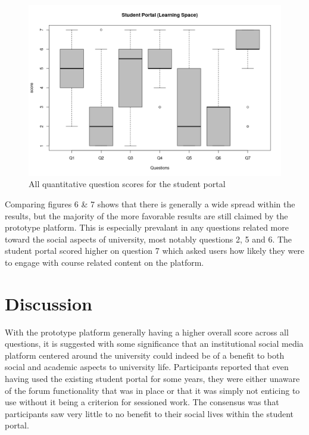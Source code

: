 \documentclass[lettersize,journal]{IEEEtran}
\begin{document}
		\begin{figure}[h!]
        		\includegraphics[width=\linewidth]{images/StudentPortalFull.png}
        		\caption{All quantitative question scores for the student portal}
        		\label{figure 6}
		\end{figure}

		Comparing figures 6 \& 7 shows that there is generally a wide spread within the results, but the majority of the more favorable results are still claimed by the prototype platform.
		This is especially prevalant in any questions related more toward the social aspects of university, most notably questions 2, 5 and 6. The student portal scored higher on question 7
		which asked users how likely they were to engage with course related content on the platform.


\section{Discussion}

With the prototype platform generally having a higher overall score across all questions, it is suggested with some significance that an institutional social media platform centered around the university
could indeed be of a benefit to both social and academic aspects to university life. Participants reported that even having used the existing student portal for some years, they were either unaware of the
forum functionality that was in place or that it was simply not enticing to use without it being a criterion for sessioned work. The consensus was that participants saw very little to no benefit
to their social lives within the student portal.
\end{document}
